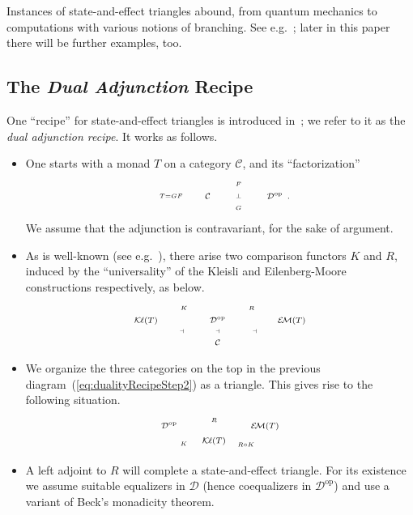 \documentclass[9pt, preprint]{sigplanconf}
\theoremstyle{theorem}
\theoremstyle{definition}
\newcommand{\cat}[1]{\mathcal{#1}}
\newcommand{\op}{\mathrm{op}}
\newcommand{\EM}{\mathcal{E}{\kern-.5ex}\mathcal{M}}
\newcommand{\Kl}{\mathcal{K}{\kern-.2ex}\ell}
\newcommand{\co}{\mathrel{\circ}}
\begin{document}
Instances of  state-and-effect triangles abound, from quantum
mechanics to computations with various notions of branching. See
e.g.~\cite{Jacobs15LMCS,Jacobs15CALCO}; later in this paper there will
be further examples, too.

\subsection{The \emph{Dual Adjunction} Recipe
}
\label{sub:dualAdjRecipe}
One ``recipe'' for state-and-effect triangles is introduced
in~\cite{Jacobs15CALCO};
we refer to it as the \emph{dual adjunction recipe}.
It works as follows.
\begin{itemize}
 \item One starts with a monad $T$ on a category $\cat{C}$, and its
       ``factorization''
       \begin{equation}\label{eq:factorizationOfAMonad}
	\scriptsize
	\xymatrix@1@C+3em{
	 {\cat{C}}
	   \ar@(lu,ld)_{T=GF}[]
	   \ar@/^/^-{F}[r]
	   \ar@{}[r]|-{\bot}
        &
	 {\cat{D}^{\op}\mathrlap{\enspace.}}
	   \ar@/^/^-{G}[l]
 	}
       \end{equation}
      We assume that the adjunction is contravariant, for the sake of
       argument.
 \item As is well-known (see e.g.~\cite{MacLane71,BarrW85}), there arise
       two comparison functors $K$ and $R$, induced by the ``universality''
       of the Kleisli and Eilenberg-Moore constructions respectively,  as below.
       \begin{equation}\label{eq:dualityRecipeStep2}
	\scriptsize
	  \vcenter{\xymatrix@R-2em@C+2em{
 {\Kl(T)}
\ar@/^/@{-->}[r]^-{K}
&
  {\cat{D}^{\op}}
  \ar@/^/@{-->}[r]^-{R}
&
  {\EM(T)}
\\
 &
  {\cat{C}}
	\ar@/^/[ul]
	\ar@/^/[ul];[]
	\ar@{}[ul]|{\dashv}
	\ar@/^/[u]
	\ar@/^/[u];[]
	\ar@{}[u]|{\dashv}
	\ar@/^/[ur]
	\ar@/^/[ur];[]
	\ar@{}[ur]|{\dashv}
  }}
       \end{equation}
 \item We organize the three categories on the top in the previous diagram~(\ref{eq:dualityRecipeStep2}) as a triangle. This gives rise to
       the following situation.
       \begin{align*}
	\scriptsize
	  \vcenter{\xymatrix@R-3em@C-1em{
  {\cat{D}^{\op}}
\ar@{->}[rr]^-{R}
&
&
  {\EM(T)}
\\
 &
 {\Kl(T)}
    \ar@/^/[ul]^-{K}
\ar@/_/[ur]_-{R\co K}
}}
       \end{align*}
 \item A left adjoint to $R$ will complete a state-and-effect
       triangle. For its existence we assume suitable equalizers in $\cat{D}$
       (hence coequalizers in $\cat{D}^{\op}$) and use a variant
       of Beck's monadicity theorem.
\end{itemize}
\end{document}
